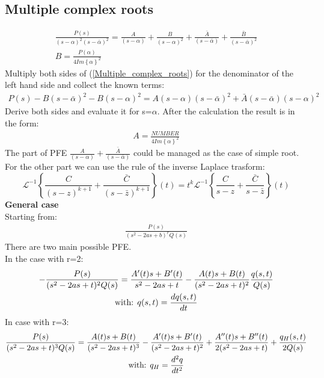 \documentclass[a4paper,12pt]{article}
\begin{document}
	\subsection{Multiple complex roots}
	\begin{gather}
		\frac{P(s)}{(s-\alpha)^2 (s- \bar \alpha)^2} = \frac{A}{(s-\alpha)} +\frac{B}{(s-\alpha)^2}+\frac{\bar A}{(s- \bar \alpha)} +\frac{\bar B}{(s- \bar \alpha)^2}
		\label{Multiple_complex_roots}\\
		B=\frac{P(\alpha )}{4 Im \left\{\alpha \right \}^2}
		\label{Multiple_complex_roots_coeff}
	\end{gather}
	Multiply both sides of (\ref{Multiple_complex_roots}) for the denominator of the left hand side and collect the known terms:
	\begin{gather}
		P(s) - B(s -\bar \alpha)^2 -B(s-\alpha)^2=A(s-\alpha)(s-\bar \alpha)^2+ \bar A (s-\bar \alpha) (s- \alpha)^2
		\label{Multiple_complex_roots_coeff_ver2}
	\end{gather}
	Derive both sides and evaluate it for s=$\alpha$. After the calculation the result is in the form:
	\begin{gather}
		A=\frac{NUMBER}{4 Im\left\{\alpha\right\}^2}
	\end{gather}
	The part of PFE $\frac{A}{(s-\alpha)}+\frac{\bar A}{(s- \bar \alpha)}$ could be managed as the case of simple root. For the other part we can use the rule of the inverse Laplace trasform:
	\begin{equation}
		\mathcal{L}^{-1} \left\{ \frac{C}{(s-z)^{k+1}} + \frac{\bar C}{(s- \bar z)^{k+1}} \right\} (t) = t^k \mathcal{L}^{-1} \left\{ \frac{C}{s-z} + \frac{\bar C}{s- \bar z} \right\} (t) 
		\label{Multiple_complex_roots_coeff_ver3}
	\end{equation}
	\textbf{General case}\\
	Starting from:
	\begin{gather}
		\frac{P(s)}{(s^2-2as+b)^r Q(s)}
	\end{gather}
	There are two main possible PFE.\\
	In the case with r=2: 
	\begin{gather}
		- \frac{P(s)}{(s^2-2as+t)^2 Q(s)}= \frac{A'(t)s+B'(t)}{s^2-2as+t}-\frac{A(t)s+B(t)}{(s^2-2as+t)^2}\frac{q(s,t)}{Q(s)} \notag{}\\
		\text{with:  } q(s,t)=\frac{d q(s,t)}{dt}
		\label{multiple_conj_1}
	\end{gather}
	In case with r=3:
	\begin{gather}
		\frac{P(s)}{(s^2-2as+t)^3 Q(s)}=\frac{A(t)s+B(t)}{(s^2-2as+t)^3}-\frac{A'(t)s+B'(t)}{(s^2-2as+t)^2}+\frac{A''(t)s+B''(t)}{2(s^2-2as+t)}+\frac{q_H(s,t)}{2 Q(s)} \notag\\
		\text{with:  } q_H=\frac{d^2q}{dt^2}
	\end{gather}
\end{document}
